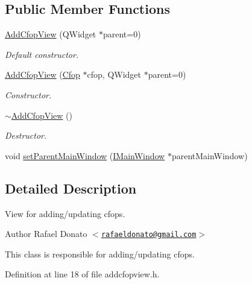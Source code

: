 \subsection*{\-Public \-Member \-Functions}
\begin{DoxyCompactItemize}
\item 
\hyperlink{class_add_cfop_view_ac11ee28b69a0f78ce059e2faaa4abcff}{\-Add\-Cfop\-View} (\-Q\-Widget $\ast$parent=0)
\begin{DoxyCompactList}\small\item\em \-Default constructor. \end{DoxyCompactList}\item 
\hyperlink{class_add_cfop_view_afc43e32ad9a1c6ebcc545348ec6a8de4}{\-Add\-Cfop\-View} (\hyperlink{class_cfop}{\-Cfop} $\ast$cfop, \-Q\-Widget $\ast$parent=0)
\begin{DoxyCompactList}\small\item\em \-Constructor. \end{DoxyCompactList}\item 
\hyperlink{class_add_cfop_view_af262b6f94cff2e942b67442d60fab03a}{$\sim$\-Add\-Cfop\-View} ()
\begin{DoxyCompactList}\small\item\em \-Destructor. \end{DoxyCompactList}\item 
void \hyperlink{class_add_cfop_view_a1321ace79219661e539b88582bcb5764}{set\-Parent\-Main\-Window} (\hyperlink{class_i_main_window}{\-I\-Main\-Window} $\ast$parent\-Main\-Window)
\end{DoxyCompactItemize}


\subsection{\-Detailed \-Description}
\-View for adding/updating cfops. 

\begin{DoxyAuthor}{\-Author}
\-Rafael \-Donato $<$\href{mailto:rafaeldonato@gmail.com}{\tt rafaeldonato@gmail.\-com}$>$
\end{DoxyAuthor}
\-This class is responsible for adding/updating cfops. 

\-Definition at line 18 of file addcfopview.\-h.



